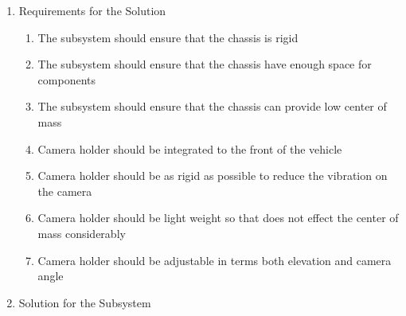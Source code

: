 \documentclass[a4paper,12pt]{article}
\begin{document}
	\begin{enumerate}
		\item {Requirements for the Solution}
		
		\begin{enumerate}
			\item The subsystem should ensure that the chassis is rigid 
			\item The subsystem should ensure that the chassis have enough space for components
			\item The subsystem should ensure that the chassis can provide low center of mass 
			\item Camera holder should be integrated to the front of the vehicle
			\item Camera holder should be as rigid as possible to reduce the vibration on the camera
			\item Camera holder should be light weight so that does not effect the center of mass considerably
			\item Camera holder should be adjustable in terms both elevation and camera angle
		\end{enumerate}


	\item {Solution for the Subsystem}





\end{enumerate}
\end{document}
